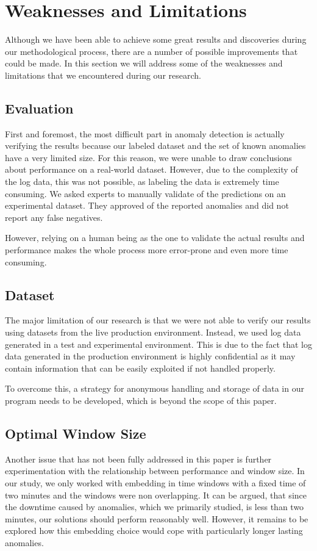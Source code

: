 \section{Weaknesses and Limitations}
Although we have been able to achieve some great results and discoveries during our methodological process, there are a number of possible improvements that could be made.
In this section we will address some of the weaknesses and limitations that we encountered during our research.

\subsection{Evaluation}
First and foremost, the most difficult part in anomaly detection is actually verifying the results because our labeled dataset and the set of known anomalies have a very limited size. 
For this reason, we were unable to draw conclusions about performance on a real-world dataset. However, due to the complexity of the log data, this was not possible, as labeling the data is extremely time consuming. We asked experts to manually validate of the predictions on an experimental dataset. They approved of the reported anomalies and did not report any false negatives. 

However, relying on a human being as the one to validate the actual results and performance makes the whole process more error-prone and even more time consuming.

\subsection{Dataset}
The major limitation of our research is that we were not able to verify our results using datasets from the live production environment. Instead, we used log data generated in a test and experimental environment.
This is due to the fact that log data generated in the production environment is highly confidential as it may contain information that can be easily exploited if not handled properly. 

To overcome this, a strategy for anonymous handling and storage of data in our program needs to be developed, which is beyond the scope of this paper.

\subsection{Optimal Window Size}
Another issue that has not been fully addressed in this paper is further experimentation with the relationship between performance and window size. 
In our study, we only worked with embedding in time windows with a fixed time of two minutes and the windows were non overlapping.
It can be argued, that since the downtime caused by anomalies, which we primarily studied, is less than two minutes, our solutions should perform reasonably well.
However, it remains to be explored how this embedding choice would cope with particularly longer lasting anomalies.

